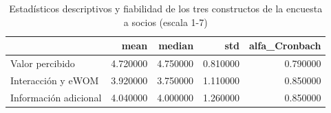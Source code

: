 \begin{table}
\caption{Estadísticos descriptivos y fiabilidad de los tres constructos de la encuesta a socios (escala 1-7)}
\label{tab:descriptivos_encuesta}
\begin{tabular}{lrrrr}
\toprule
 & mean & median & std & alfa\_Cronbach \\
\midrule
Valor percibido & 4.720000 & 4.750000 & 0.810000 & 0.790000 \\
Interacción y eWOM & 3.920000 & 3.750000 & 1.110000 & 0.850000 \\
Información adicional & 4.040000 & 4.000000 & 1.260000 & 0.850000 \\
\bottomrule
\end{tabular}
\end{table}
